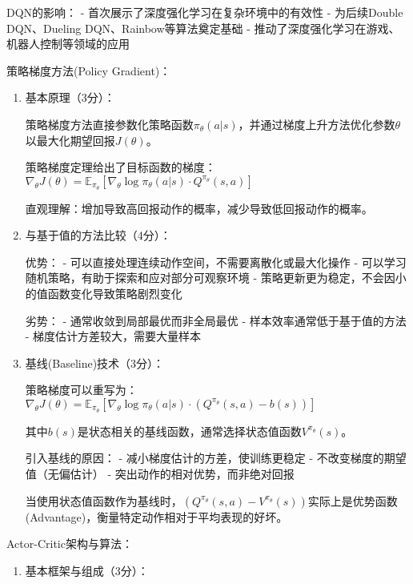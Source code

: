 \documentclass[zihao=5,answers]{BHCexam}
\begin{document}
\begin{questions}
\begin{solution}
\begin{enumerate}
    DQN的影响：
    - 首次展示了深度强化学习在复杂环境中的有效性
    - 为后续Double DQN、Dueling DQN、Rainbow等算法奠定基础
    - 推动了深度强化学习在游戏、机器人控制等领域的应用
\end{enumerate}
\end{solution}

\question[10] 策略梯度方法(Policy Gradient)：
\begin{solution}
\begin{enumerate}
    \item 基本原理（3分）：
    
    策略梯度方法直接参数化策略函数$\pi_\theta(a|s)$，并通过梯度上升方法优化参数$\theta$以最大化期望回报$J(\theta)$。
    
    策略梯度定理给出了目标函数的梯度：
    $\nabla_\theta J(\theta) = \mathbb{E}_{\pi_\theta} [\nabla_\theta \log \pi_\theta(a|s) \cdot Q^{\pi_\theta}(s,a)]$
    
    直观理解：增加导致高回报动作的概率，减少导致低回报动作的概率。
    
    \item 与基于值的方法比较（4分）：
    
    优势：
    - 可以直接处理连续动作空间，不需要离散化或最大化操作
    - 可以学习随机策略，有助于探索和应对部分可观察环境
    - 策略更新更为稳定，不会因小的值函数变化导致策略剧烈变化
    
    劣势：
    - 通常收敛到局部最优而非全局最优
    - 样本效率通常低于基于值的方法
    - 梯度估计方差较大，需要大量样本
    
    \item 基线(Baseline)技术（3分）：
    
    策略梯度可以重写为：$\nabla_\theta J(\theta) = \mathbb{E}_{\pi_\theta} [\nabla_\theta \log \pi_\theta(a|s) \cdot (Q^{\pi_\theta}(s,a) - b(s))]$
    
    其中$b(s)$是状态相关的基线函数，通常选择状态值函数$V^{\pi_\theta}(s)$。
    
    引入基线的原因：
    - 减小梯度估计的方差，使训练更稳定
    - 不改变梯度的期望值（无偏估计）
    - 突出动作的相对优势，而非绝对回报
    
    当使用状态值函数作为基线时，$(Q^{\pi_\theta}(s,a) - V^{\pi_\theta}(s))$实际上是优势函数(Advantage)，衡量特定动作相对于平均表现的好坏。
\end{enumerate}
\end{solution}

\question[10] Actor-Critic架构与算法：
\begin{solution}
\begin{enumerate}
    \item 基本框架与组成（3分）：
    

\end{enumerate}
\end{solution}
\end{questions}
\end{document}
